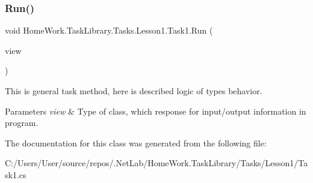 \subsubsection{\texorpdfstring{Run()}{Run()}}
{\footnotesize\ttfamily void Home\+Work.\+Task\+Library.\+Tasks.\+Lesson1.\+Task1.\+Run (\begin{DoxyParamCaption}\item[{I\+Information}]{view }\end{DoxyParamCaption})}



This is general task method, here is described logic of types behavior. 


\begin{DoxyParams}{Parameters}
{\em view} & Type of class, which response for input/output information in program.\\
\hline
\end{DoxyParams}


The documentation for this class was generated from the following file\+:\begin{DoxyCompactItemize}
\item 
C\+:/\+Users/\+User/source/repos/.\+Net\+Lab/\+Home\+Work.\+Task\+Library/\+Tasks/\+Lesson1/Task1.\+cs\end{DoxyCompactItemize}
